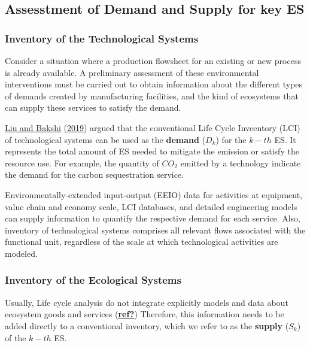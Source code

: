 \documentclass[
  14pt,
]{extarticle}
\begin{document}
\hypertarget{assesstment-of-demand-and-supply-for-key-es}{%
\subsection{Assesstment of Demand and Supply for key ES}\label{assesstment-of-demand-and-supply-for-key-es}}

\hypertarget{inventory-of-the-technological-systems}{%
\subsubsection{Inventory of the Technological Systems}\label{inventory-of-the-technological-systems}}

Consider a situation where a production flowsheet for an existing or new process is already available.
A preliminary assessment of these environmental interventions must be carried out to obtain information about the different types of demands created by manufacturing facilities, and the kind of ecosystems that can supply these services to satisfy the demand.

\protect\hyperlink{ref-Liu2019g}{Liu and Bakshi} (\protect\hyperlink{ref-Liu2019g}{2019}) argued that the conventional Life Cycle Inveentory (LCI) of technological systems can be used as the \textbf{demand} (\(D_{k}\)) for the \(k-th\) ES.
It represents the total amount of ES needed to mitigate the emission or satisfy the resource use.
For example, the quantity of \(CO_{2}\) emitted by a technology indicate the demand for the carbon sequestration service.

Environmentally-extended input-output (EEIO) data for activities at equipment, value chain and economy scale, LCI databases, and detailed engineering models can supply information to quantify the respective demand for each service.
Also, inventory of technological systems comprises all relevant flows associated with the functional unit, regardless of the scale at which technological activities are modeled.

\hypertarget{inventory-of-the-ecological-systems}{%
\subsubsection{Inventory of the Ecological Systems}\label{inventory-of-the-ecological-systems}}

Usually, Life cycle analysis do not integrate explicitly models and data about ecosystem goods and services (\protect\hyperlink{ref-ref}{\textbf{ref?}})
Therefore, this information needs to be added directly to a conventional inventory, which we refer to as the \textbf{supply} (\(S_{k}\)) of the \(k-th\) ES.
\end{document}
